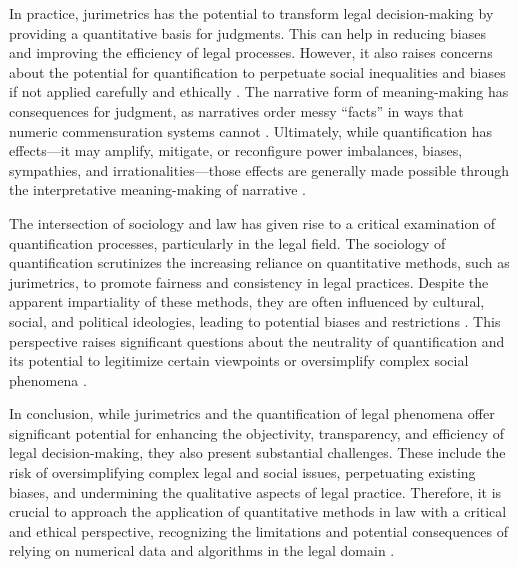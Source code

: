 In practice, jurimetrics has the potential to transform legal decision-making by providing a quantitative basis for judgments. This can help in reducing biases and improving the efficiency of legal processes. However, it also raises concerns about the potential for quantification to perpetuate social inequalities and biases if not applied carefully and ethically \cite{101111lsi_12334}. The narrative form of meaning-making has consequences for judgment, as narratives order messy “facts” in ways that numeric commensuration systems cannot \cite{10_1111_lsi_12334}. Ultimately, while quantification has effects—it may amplify, mitigate, or reconfigure power imbalances, biases, sympathies, and irrationalities—those effects are generally made possible through the interpretative meaning-making of narrative \cite{10_1111_lsi_12334}.

The intersection of sociology and law has given rise to a critical examination of quantification processes, particularly in the legal field. The sociology of quantification scrutinizes the increasing reliance on quantitative methods, such as jurimetrics, to promote fairness and consistency in legal practices. Despite the apparent impartiality of these methods, they are often influenced by cultural, social, and political ideologies, leading to potential biases and restrictions \cite{10.1057/s41599-020-00557-0, de2010jurimetrics, 10.1177/09596801221075807}. This perspective raises significant questions about the neutrality of quantification and its potential to legitimize certain viewpoints or oversimplify complex social phenomena \cite{10.1111/ilr.12067, 10.20396/rdbci.v18i0.8658889}.

In conclusion, while jurimetrics and the quantification of legal phenomena offer significant potential for enhancing the objectivity, transparency, and efficiency of legal decision-making, they also present substantial challenges. These include the risk of oversimplifying complex legal and social issues, perpetuating existing biases, and undermining the qualitative aspects of legal practice. Therefore, it is crucial to approach the application of quantitative methods in law with a critical and ethical perspective, recognizing the limitations and potential consequences of relying on numerical data and algorithms in the legal domain \cite{10_1111_lsi_12334}.


